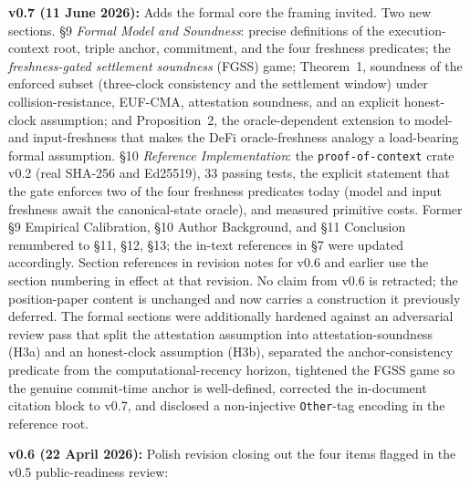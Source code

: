 \documentclass[11pt]{article}
\begin{document}
\textbf{v0.7 (11 June 2026):} Adds the formal core the framing invited. Two new sections. \S9 \emph{Formal Model and Soundness}: precise definitions of the execution-context root, triple anchor, commitment, and the four freshness predicates; the \emph{freshness-gated settlement soundness} (FGSS) game; Theorem~1, soundness of the enforced subset (three-clock consistency and the settlement window) under collision-resistance, EUF-CMA, attestation soundness, and an explicit honest-clock assumption; and Proposition~2, the oracle-dependent extension to model- and input-freshness that makes the DeFi oracle-freshness analogy a load-bearing formal assumption. \S10 \emph{Reference Implementation}: the \texttt{proof-of-context} crate v0.2 (real SHA-256 and Ed25519), 33 passing tests, the explicit statement that the gate enforces two of the four freshness predicates today (model and input freshness await the canonical-state oracle), and measured primitive costs. Former \S9 Empirical Calibration, \S10 Author Background, and \S11 Conclusion renumbered to \S11, \S12, \S13; the in-text references in \S7 were updated accordingly. Section references in revision notes for v0.6 and earlier use the section numbering in effect at that revision. No claim from v0.6 is retracted; the position-paper content is unchanged and now carries a construction it previously deferred. The formal sections were additionally hardened against an adversarial review pass that split the attestation assumption into attestation-soundness (H3a) and an honest-clock assumption (H3b), separated the anchor-consistency predicate from the computational-recency horizon, tightened the FGSS game so the genuine commit-time anchor is well-defined, corrected the in-document citation block to v0.7, and disclosed a non-injective \texttt{Other}-tag encoding in the reference root.

\textbf{v0.6 (22 April 2026):} Polish revision closing out the four items flagged in the v0.5 public-readiness review:
\end{document}
